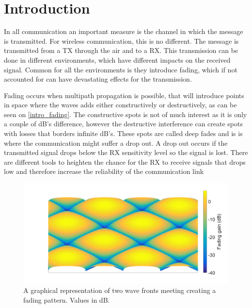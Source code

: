\chapter{Introduction}

%

In all communication an important measure is the channel in which the message is transmitted. For wireless communication, this is no different. The message is transmitted from a \gls{TX} through the air and to a \gls{RX}. This transmission can be done in different environments, which have different impacts on the received signal. Common for all the environments is they introduce fading, which if not accounted for can have devastating effects for the transmission. 

Fading occurs when multipath propagation is possible, that will introduce points in space where the waves adds either constructively or destructively, as can be seen on \autoref{intro_fading}. The constructive spots is not of much interest as it is only a couple of dB's difference, however the destructive interference can create spots with losses that borders infinite dB's. These spots are called deep fades and is is where the communication might suffer a drop out. A drop out occurs if the transmitted signal drops below the RX sensitivity level so the signal is lost. There are different tools to heighten the chance for the RX to receive signals that drops low and therefore increase the reliability of the communication link


\begin{figure}[H]
\centering
\includegraphics[width=\textwidth]{figures/intro_fading.png}
\caption{A graphical representation of two wave fronts meeting creating a fading pattern. Values in dB.}
\label{intro_fading}
\end{figure}

